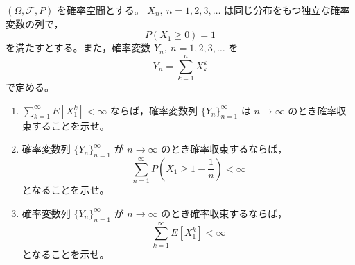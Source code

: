 \newcommand{\C}{\mathbb{C}}
\newcommand{\R}{\mathbb{R}}
\newcommand{\Z}{\mathbb{Z}}
\newcommand{\Tr}{\operatorname{Tr}}
\newcommand{\Impart}{\operatorname{Im}}
\newcommand{\AF}{\operatorname{AF}}
\newcommand{\AX}{\operatorname{AX}}
\newcommand{\GL}{\operatorname{GL}}


\((\Omega,\mathcal F,P)\) を確率空間とする。
\(X_n,\ n=1,2,3,\ldots\) は同じ分布をもつ独立な確率変数の列で，
\[
  P(X_1\ge0)=1
\]
を満たすとする。また，確率変数 \(Y_n,\ n=1,2,3,\ldots\) を
\[
  Y_n=\sum_{k=1}^{n}X_k^k
\]
で定める。

\begin{enumerate}
  \item \(\displaystyle \sum_{k=1}^{\infty}E[X_1^k]<\infty\) ならば，確率変数列
  \(\{Y_n\}_{n=1}^{\infty}\) は \(n\to\infty\) のとき確率収束することを示せ。
  \item 確率変数列 \(\{Y_n\}_{n=1}^{\infty}\) が \(n\to\infty\) のとき確率収束するならば，
  \[
    \sum_{n=1}^{\infty}P\left(X_1\ge 1-\frac1n\right)<\infty
  \]
  となることを示せ。
  \item 確率変数列 \(\{Y_n\}_{n=1}^{\infty}\) が \(n\to\infty\) のとき確率収束するならば，
  \[
    \sum_{k=1}^{\infty}E[X_1^k]<\infty
  \]
  となることを示せ。
\end{enumerate}

%